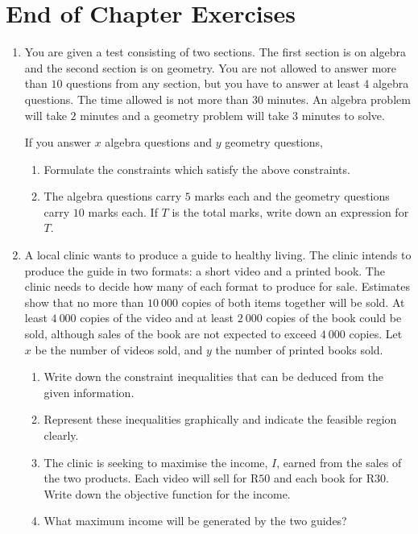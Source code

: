 \section{End of Chapter Exercises}
\begin{enumerate}

\item{You are given a test consisting of two sections. The first section is on algebra and the second section is on geometry. You are not allowed to answer more than $10$ questions from any section, but you have to answer at least $4$ algebra questions. The time allowed is not more than $30$ minutes. An algebra problem will take $2$ minutes and a geometry problem will take $3$ minutes to solve.

If you answer $x$ algebra questions and $y$ geometry questions,
\begin{enumerate}
\item{Formulate the constraints which satisfy the above constraints.}
\item{The algebra questions carry $5$ marks each and the geometry questions carry $10$ marks each. If $T$ is the total marks, write down an expression for $T$.}
\end{enumerate}}

\item{A local clinic wants to produce a guide to healthy living. The clinic intends to produce the guide in two formats: a short video and a printed book. The clinic needs to decide how many of each format to produce for sale. Estimates show that no more than $10~000$ copies of both items together will be sold. At least $4~000$ copies of the video and at least $2~000$ copies of the book could be sold, although sales of the book are not expected to exceed $4~000$ copies. Let $x$ be the number of videos sold, and $y$ the number of printed books sold.
\begin{enumerate}
\item{Write down the constraint inequalities that can be deduced from the given information.}
\item{Represent these inequalities graphically and indicate the feasible region clearly.}
\item{The clinic is seeking to maximise the income, $I$, earned from the sales of the two products. Each video will sell for R$50$ and each book for R$30$. Write down the objective function for the income.}
\item{What maximum income will be generated by the two guides?}
\end{enumerate}}


\end{enumerate}
